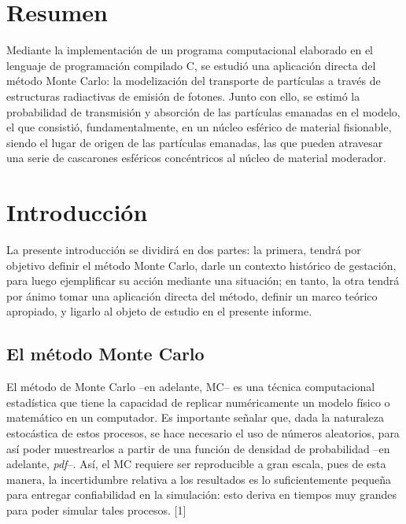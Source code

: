 \documentclass[12pt]{article}
\begin{document}

\tableofcontents
\pagebreak


\listoffigures
\listoftables

\newpage

\section{Resumen}
Mediante la implementación de un programa computacional elaborado en el lenguaje de programación compilado C, se estudió una aplicación directa del método Monte Carlo: la modelización del transporte de partículas a través de estructuras radiactivas de emisión de fotones. Junto con ello, se estimó la probabilidad de transmisión y absorción de las partículas emanadas en el modelo, el que consistió, fundamentalmente, en un núcleo esférico de material fisionable, siendo el lugar de origen de las partículas emanadas, las que pueden atravesar una serie de cascarones esféricos concéntricos al núcleo de material moderador.

\newpage

\section{Introducción}
La presente introducción se dividirá en dos partes: la primera, tendrá por objetivo definir el método Monte Carlo, darle un contexto histórico de gestación, para luego ejemplificar su acción mediante una situación; en tanto, la otra tendrá por ánimo tomar una aplicación directa del método, definir un marco teórico apropiado, y ligarlo al objeto de estudio en el presente informe.

\subsection{El método Monte Carlo}
El método de Monte Carlo --en adelante, MC-- es una técnica computacional estadística que tiene la capacidad de replicar numéricamente un modelo físico o matemático en un computador. Es importante señalar que, dada la naturaleza estocástica de estos procesos, se hace necesario el uso de números aleatorios, para así poder muestrearlos a partir de una función de densidad de probabilidad --en adelante, \emph{pdf}--. Así, el MC requiere ser reproducible a gran escala, pues de esta manera, la incertidumbre relativa a los resultados es lo suficientemente pequeña para entregar confiabilidad en la simulación: esto deriva en tiempos muy grandes para poder simular tales procesos. [1] \\
\end{document}
